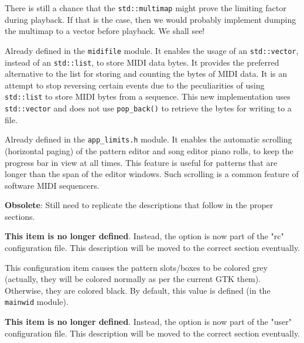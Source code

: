         There is still a chance that the \texttt{std::multimap} might prove the
        limiting factor during playback.  If that is the case, then we would
        probably implement dumping the multimap to a vector before playback.
        We shall see!

        Already defined in the \texttt{midifile} module.
        It enables the usage of an
        \texttt{std::vector}, instead of an \texttt{std::list},
        to store MIDI data bytes.
        It provides the preferred alternative to the list for storing and
        counting the bytes of MIDI data.  It is an attempt to stop reversing
        certain events due to the peculiarities of using \texttt{std::list} to
        store MIDI bytes from a sequence.  This new implementation uses
        \texttt{std::vector} and does not use \texttt{pop\_back()} to retrieve
        the bytes for writing to a file.

        Already defined in the \texttt{app\_limits.h} module.
        It enables the automatic scrolling (horizontal paging) of the pattern
        editor and song editor piano rolls, to keep the progress bar in view at
        all times.  This feature is useful for patterns that are longer than
        the span of the editor windows.  Such scrolling is a common
        feature of software MIDI sequencers.

   \textbf{Obsolete}:  Still need to replicate the descriptions that follow
      in the proper sections.

        \textbf{This item is no longer defined}.
        Instead, the option is now part of the "rc" configuration file.  This
        description will be moved to the correct section eventually.

        This configuration item causes the pattern slots/boxes to be colored
        grey (actually, they will be colored normally as per the current GTK
        them).  Otherwise, they are colored black.  By default, this value is
        defined (in the \texttt{mainwid} module).

        \textbf{This item is no longer defined}.
        Instead, the option is now part of the "user" configuration file.  This
        description will be moved to the correct section eventually.

